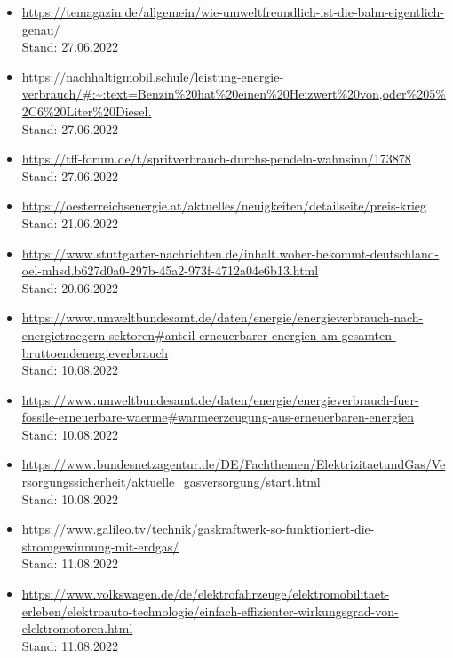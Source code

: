 \documentclass[a4paper,12pt]{scrartcl}
\begin{document}
\begin{itemize}
\item \url{https://temagazin.de/allgemein/wie-umweltfreundlich-ist-die-bahn-eigentlich-genau/} \\ Stand: 27.06.2022
\item \url{https://nachhaltigmobil.schule/leistung-energie-verbrauch/#:~:text=Benzin\%20hat\%20einen\%20Heizwert\%20von,oder\%205\%2C6\%20Liter\%20Diesel.} \\ Stand: 27.06.2022
\item \url{https://tff-forum.de/t/spritverbrauch-durchs-pendeln-wahnsinn/173878} \\ Stand: 27.06.2022
\item \url{https://oesterreichsenergie.at/aktuelles/neuigkeiten/detailseite/preis-krieg} \\ Stand: 21.06.2022
\item \url{https://www.stuttgarter-nachrichten.de/inhalt.woher-bekommt-deutschland-oel-mhsd.b627d0a0-297b-45a2-973f-4712a04e6b13.html} \\ Stand: 20.06.2022
\item \url{https://www.umweltbundesamt.de/daten/energie/energieverbrauch-nach-energietraegern-sektoren#anteil-erneuerbarer-energien-am-gesamten-bruttoendenergieverbrauch} \\ Stand: 10.08.2022
\item \url{https://www.umweltbundesamt.de/daten/energie/energieverbrauch-fuer-fossile-erneuerbare-waerme#warmeerzeugung-aus-erneuerbaren-energien} \\ Stand: 10.08.2022
\item \url{https://www.bundesnetzagentur.de/DE/Fachthemen/ElektrizitaetundGas/Versorgungssicherheit/aktuelle_gasversorgung/start.html} \\ Stand: 10.08.2022
\item \url{https://www.galileo.tv/technik/gaskraftwerk-so-funktioniert-die-stromgewinnung-mit-erdgas/} \\ Stand: 11.08.2022
\item \url{https://www.volkswagen.de/de/elektrofahrzeuge/elektromobilitaet-erleben/elektroauto-technologie/einfach-effizienter-wirkungsgrad-von-elektromotoren.html} \\ Stand: 11.08.2022
\end{itemize}
\end{document}
